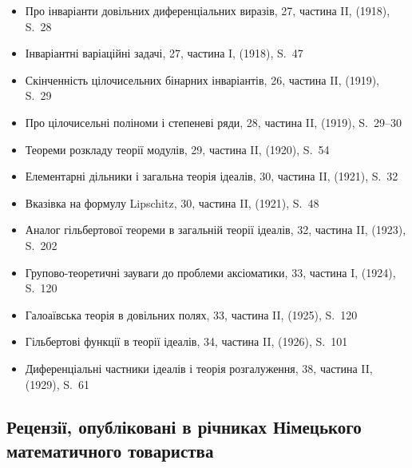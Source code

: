 \documentclass[11pt]{article}
\begin{document}
\begin{itemize}[leftmargin=1.5em,itemsep=0.2em]
\item Про інваріанти довільних диференціальних виразів, 27, частина II, (1918), S.~28
\item Інваріантні варіаційні задачі, 27, частина I, (1918), S.~47
\item Скінченність цілочисельних бінарних інваріантів, 26, частина II, (1919), S.~29
\item Про цілочисельні поліноми і степеневі ряди, 28, частина II, (1919), S.~29--30
\item Теореми розкладу теорії модулів, 29, частина II, (1920), S.~54
\item Елементарні дільники і загальна теорія ідеалів, 30, частина II, (1921), S.~32
\item Вказівка на формулу Lipschitz, 30, частина II, (1921), S.~48
\item Аналог гільбертової теореми в загальній теорії ідеалів, 32, частина II, (1923), S.~202
\item Групово-теоретичні зауваги до проблеми аксіоматики, 33, частина I, (1924), S.~120
\item Галоаївська теорія в довільних полях, 33, частина II, (1925), S.~120
\item Гільбертові функції в теорії ідеалів, 34, частина II, (1926), S.~101
\item Диференціальні частники ідеалів і теорія розгалуження, 38, частина II, (1929), S.~61
\end{itemize}

\subsection*{Рецензії, опубліковані в річниках Німецького математичного товариства}
\end{document}
